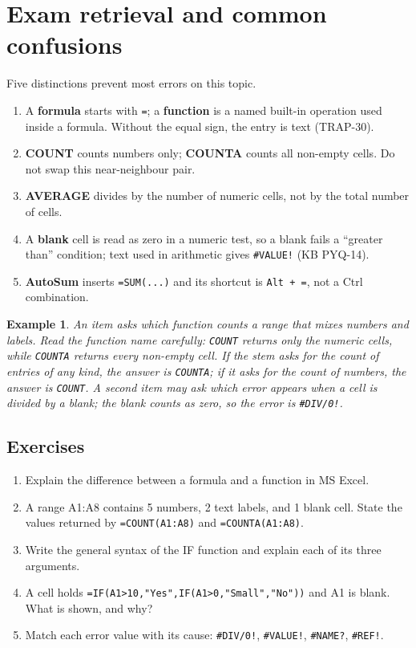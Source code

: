 \documentclass[11pt]{article}
\newtheorem{example}{Example}[section]
\begin{document}
\section{Exam retrieval and common confusions}
Five distinctions prevent most errors on this topic.
\begin{enumerate}
  \item A \textbf{formula} starts with \texttt{=}; a \textbf{function} is a
    named built-in operation used inside a formula. Without the equal sign,
    the entry is text (TRAP-30).
  \item \textbf{COUNT} counts numbers only; \textbf{COUNTA} counts all
    non-empty cells. Do not swap this near-neighbour pair.
  \item \textbf{AVERAGE} divides by the number of numeric cells, not by the
    total number of cells.
  \item A \textbf{blank} cell is read as zero in a numeric test, so a blank
    fails a ``greater than'' condition; text used in arithmetic gives
    \texttt{\#VALUE!} (KB PYQ-14).
  \item \textbf{AutoSum} inserts \texttt{=SUM(...)} and its shortcut is
    \texttt{Alt + =}, not a Ctrl combination.
\end{enumerate}

\begin{example}
An item asks which function counts a range that mixes numbers and labels.
Read the function name carefully: \texttt{COUNT} returns only the numeric
cells, while \texttt{COUNTA} returns every non-empty cell. If the stem asks
for the count of entries of any kind, the answer is \texttt{COUNTA}; if it
asks for the count of numbers, the answer is \texttt{COUNT}. A second item
may ask which error appears when a cell is divided by a blank; the blank
counts as zero, so the error is \texttt{\#DIV/0!}.
\end{example}

\subsection*{Exercises}
\begin{enumerate}[label=\arabic*.]
  \item Explain the difference between a formula and a function in MS Excel.
  \item A range A1:A8 contains 5 numbers, 2 text labels, and 1 blank cell.
    State the values returned by \texttt{=COUNT(A1:A8)} and
    \texttt{=COUNTA(A1:A8)}.
  \item Write the general syntax of the IF function and explain each of its
    three arguments.
  \item A cell holds \texttt{=IF(A1>10,"Yes",IF(A1>0,"Small","No"))} and A1 is
    blank. What is shown, and why?
  \item Match each error value with its cause: \texttt{\#DIV/0!},
    \texttt{\#VALUE!}, \texttt{\#NAME?}, \texttt{\#REF!}.
\end{enumerate}
\end{document}
